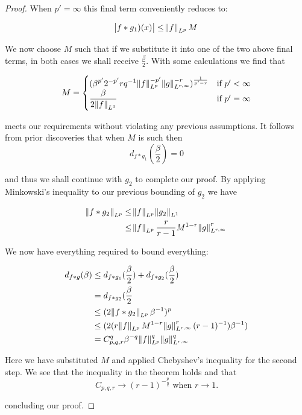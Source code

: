 \begin{proof}
When $p' = \infty$ this final term conveniently reduces to:

\begin{equation}
\abs{ f \ast g_1)(x)} \leq \norm{f}_{L^p}M
\end{equation}
 
We now choose $M$ such that if we substitute it into one of the two above final terms, in both cases we shall receive $\frac{\beta}{2}$. With some calculations we find that

\begin{equation}
M = \begin{cases}
\displaystyle
(\beta^{p'} 2^{-p'} rq^{-1} \norm{f}^{-p'}_{L^p} \norm{g}^{-r}_{L^{r,\infty}})^\frac{1}{p'-r} & \text{if } p' < \infty \\
\displaystyle
\frac{\beta}{2 \norm{f}_{L^1}} & \text{if } p' = \infty
\end{cases}
\end{equation}

meets our requirements without violating any previous assumptions. It follows from prior discoveries that when $M$ is such then
\begin{equation}
d_{f \ast g_1}(\frac{\beta}{2})= 0
\end{equation}

and thus we shall continue with $g_2$ to complete 
our proof. By applying Minkowski's inequality to our previous bounding of $g_2$ we have

\begin{align*}
\norm{f \ast g_2}_{L^p} &\leq \norm{f}_{L^p} \norm{g_2}_{L^1} \\
&\leq \norm{f}_{L^p} \frac{r}{r-1} M^{1-r} \norm{g}^r_{L^{r,\infty}}
\end{align*}

We now have everything required to bound everything:

\begin{align*}
d_{f \ast g}(\beta) &\leq d_{f \ast g_1}(\frac{\beta}{2}) + d_{f \ast g_2}(\frac{\beta}{2}) \\
&= d_{f \ast g_2}(\frac{\beta}{2} \\
&\leq (2 \norm{f \ast g_2}_{L^p} \beta^{-1}) ^ p \\
&\leq (2 (r \norm{f}_{L^p} M^{1-r} \norm{g}^r_{L^{r,\infty}} (r-1)^{-1}) \beta^{-1})\\
&= C^q_{p,q,r} \beta^{-q} \norm{f}^q_{L^p} \norm{g}^q_{L^{r,\infty}}
\end{align*}

Here we have substituted $M$ and applied Chebyshev's inequality for the second step. We see that the inequality in the theorem holds and that 
\begin{equation*}
C_{p,q,r} \to (r-1)^{-\frac{p}{q}} \text{ when } r \to 1.
\end{equation*}

concluding our proof.

\end{proof}

